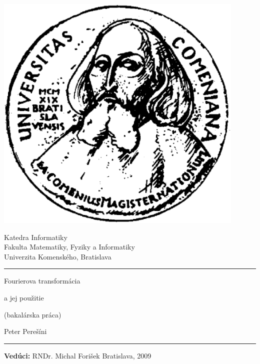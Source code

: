 \documentclass[11pt,a4paper]{book}
\title{\mytitle}
\author{\myname}
\date{}
\def\mytitleone{Fourierova transformácia}
\def\mytitletwo{a jej použitie}
\def\myname{Peter Perešíni}
\def\myleader{RNDr. Michal Forišek}
\begin{document}
\frontmatter

\thispagestyle{empty}


\begin{minipage}{0.25\textwidth}
\includegraphics[width=0.9\textwidth]{obrazky/komlogo}
\end{minipage}
\begin{minipage}{0.69\textwidth}
\begin{center}
\sc Katedra Informatiky \\
Fakulta Matematiky, Fyziky a Informatiky \\
Univerzita Komenského, Bratislava
\end{center}
\end{minipage}

\vfill
\begin{center}
\begin{minipage}{0.8\textwidth}
\hrule
\bigskip\bigskip
\centerline{\LARGE\sc \mytitleone}
\bigskip
\centerline{\LARGE\sc \mytitletwo}
\smallskip
\centerline{(bakalárska práca)}
\bigskip
\bigskip
\centerline{\large\sc \myname}
\bigskip\bigskip
\hrule
\end{minipage}
\end{center}
\vfill
{\bf Vedúci:} \myleader
\hfill Bratislava, 2009
\eject %

\pagecolor{white}
\thispagestyle{empty}~\vfill\eject %
\end{document}
